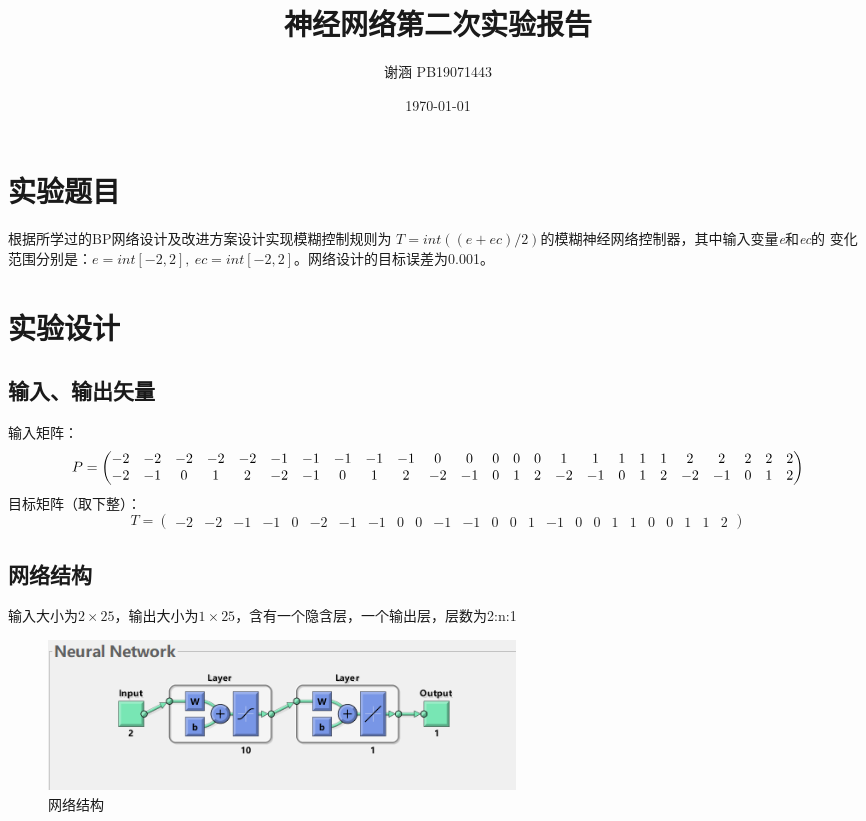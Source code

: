 \documentclass[UTF8]{article}
\title{神经网络第二次实验报告}
\author{谢涵 PB19071443}
\date{\today}
\begin{document}
\maketitle
\section{实验题目}
根据所学过的BP网络设计及改进方案设计实现模糊控制规则为
$T= int((e+ec)/2)$的模糊神经网络控制器，其中输入变量\emph{e}和\emph{ec}的
变化范围分别是：$e = int[-2, 2],\ ec = int[-2, 2]$。网络设计的目标误差为0.001。

\section{实验设计}
\subsection{输入、输出矢量}
输入矩阵：
\begin{equation}
	P=\left(
        \addtocounter{MaxMatrixCols}{25}
        \begin{matrix}
		-2 & -2 & -2 & -2 & -2 & -1 & -1 & -1 & -1 & -1 & 0  & 0  & 0 & 0 & 0 & 1  & 1  & 1 & 1 & 1 & 2  & 2  & 2 & 2 & 2 \\
		-2 & -1 & 0  & 1  & 2  & -2 & -1 & 0  & 1  & 2  & -2 & -1 & 0 & 1 & 2 & -2 & -1 & 0 & 1 & 2 & -2 & -1 & 0 & 1 & 2
	\end{matrix}\nonumber
	\right)
\end{equation}
目标矩阵（取下整）：
\begin{equation}
	T=\left(
	\begin{matrix}
		-2 & -2 & -1 & -1 & 0 & -2 & -1 & -1 & 0 & 0 & -1 & -1 & 0 & 0 & 1 & -1 & 0 & 0 & 1 & 1 & 0 & 0 & 1 & 1 & 2
	\end{matrix}\nonumber
	\right)
\end{equation}
\subsection{网络结构}
输入大小为$2\times 25$，输出大小为$1\times 25$，含有一个隐含层，一个输出层，层数为2:n:1
\begin{figure}[H]
\centering
	\includegraphics[width=0.6\textwidth]{image1.png}
    \caption[0.3\textwidth]{网络结构}
\end{figure}
\end{document}
